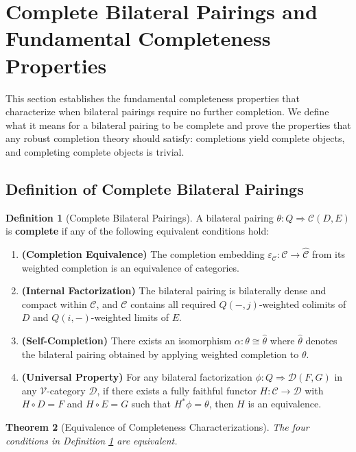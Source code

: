 \documentclass[11pt]{article}
\theoremstyle{plain}
\newtheorem{theorem}{Theorem}[section]
\theoremstyle{definition}
\newtheorem{definition}[theorem]{Definition}
\theoremstyle{remark}
\newcommand{\V}{\mathcal{V}}
\newcommand{\C}{\mathcal{C}}
\newcommand{\D}{\mathcal{D}}
\newcommand{\wh}[1]{\widehat{#1}}
\begin{document}
\section{Complete Bilateral Pairings and Fundamental Completeness Properties}

This section establishes the fundamental completeness properties that characterize when bilateral pairings require no further completion. We define what it means for a bilateral pairing to be complete and prove the properties that any robust completion theory should satisfy: completions yield complete objects, and completing complete objects is trivial.

\subsection{Definition of Complete Bilateral Pairings}

\begin{definition}[Complete Bilateral Pairings]\label{def:complete-pairing}
A bilateral pairing $\theta : Q \Rightarrow \C(D, E)$ is \textbf{complete} if any of the following equivalent conditions hold:

\begin{enumerate}
\item \textbf{(Completion Equivalence)} The completion embedding $\varepsilon_\C : \C \to \wh{\C}$ from its weighted completion is an equivalence of categories.

\item \textbf{(Internal Factorization)} The bilateral pairing is bilaterally dense and compact within $\C$, and $\C$ contains all required $Q(-, j)$-weighted colimits of $D$ and $Q(i, -)$-weighted limits of $E$.

\item \textbf{(Self-Completion)} There exists an isomorphism $\alpha : \theta \cong \wh{\theta}$ where $\wh{\theta}$ denotes the bilateral pairing obtained by applying weighted completion to $\theta$.

\item \textbf{(Universal Property)} For any bilateral factorization $\phi : Q \Rightarrow \D(F, G)$ in any $\V$-category $\D$, if there exists a fully faithful functor $H : \C \to \D$ with $H \circ D = F$ and $H \circ E = G$ such that $H^* \phi = \theta$, then $H$ is an equivalence.
\end{enumerate}
\end{definition}

\begin{theorem}[Equivalence of Completeness Characterizations]\label{thm:completeness-equivalence}
The four conditions in Definition \ref{def:complete-pairing} are equivalent.
\end{theorem}
\end{document}
